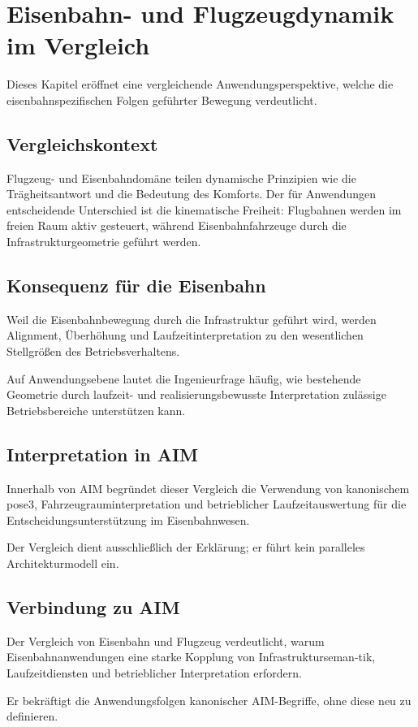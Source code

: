 
\chapter{Eisenbahn- und Flugzeugdynamik im Vergleich}
\label{chap:railway-vs-aircraft}

Dieses Kapitel eröffnet eine vergleichende Anwendungsperspektive, welche
die eisenbahnspezifischen Folgen geführter Bewegung verdeutlicht.

\section{Vergleichskontext}

Flugzeug- und Eisenbahndomäne teilen dynamische Prinzipien wie die
Trägheitsantwort und die Bedeutung des Komforts. Der für Anwendungen
entscheidende Unterschied ist die kinematische Freiheit: Flugbahnen
werden im freien Raum aktiv gesteuert, während Eisenbahnfahrzeuge durch
die Infrastrukturgeometrie geführt werden.

\section{Konsequenz für die Eisenbahn}

Weil die Eisenbahnbewegung durch die Infrastruktur geführt wird, werden
Alignment, Überhöhung und Laufzeitinterpretation zu den wesentlichen
Stellgrößen des Betriebsverhaltens.

Auf Anwendungsebene lautet die Ingenieurfrage häufig, wie bestehende
Geometrie durch laufzeit- und realisierungsbewusste Interpretation
zulässige Betriebsbereiche unterstützen kann.

\section{Interpretation in AIM}

Innerhalb von AIM begründet dieser Vergleich die Verwendung von
kanonischem pose3, Fahrzeugrauminterpretation und betrieblicher
Laufzeitauswertung für die Entscheidungsunterstützung im Eisenbahnwesen.

Der Vergleich dient ausschließlich der Erklärung; er führt kein
paralleles Architekturmodell ein.

\section{Verbindung zu AIM}

\begin{summary}
Der Vergleich von Eisenbahn und Flugzeug verdeutlicht, warum
Eisenbahnanwendungen eine starke Kopplung von Infrastrukturseman-tik,
Laufzeitdiensten und betrieblicher Interpretation erfordern.

Er bekräftigt die Anwendungsfolgen kanonischer AIM-Begriffe, ohne diese
neu zu definieren.
\end{summary}
